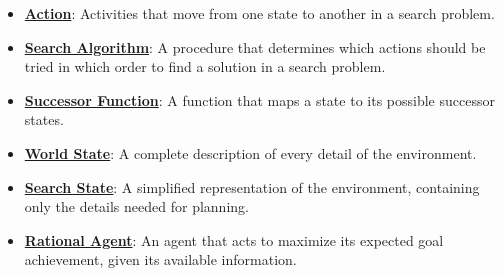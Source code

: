 \documentclass{article}%
\begin{document}
\begin{itemize}[leftmargin=*]
\item \href{https://purdue.brightspace.com/d2l/common/assets/pdfjs-d2l-dist/1.0.14-legacy/web/viewer.html?file=%2Fcontent%2Fenforced%2F1095467-wl.202510.CS.24300.001%2F14L1-DepthFS.pdf%3Fou%3D1095467&lang=en-us&container=d2l-fileviewer-rendered-pdf&fullscreen=d2l-fileviewer-rendered-pdf-dialog&height=667#page=14}{\textbf{Action}}: Activities that move from one state to another in a search problem.%
\item \href{https://purdue.brightspace.com/d2l/common/assets/pdfjs-d2l-dist/1.0.14-legacy/web/viewer.html?file=%2Fcontent%2Fenforced%2F1095467-wl.202510.CS.24300.001%2F14L1-DepthFS.pdf%3Fou%3D1095467&lang=en-us&container=d2l-fileviewer-rendered-pdf&fullscreen=d2l-fileviewer-rendered-pdf-dialog&height=667#page=14}{\textbf{Search Algorithm}}: A procedure that determines which actions should be tried in which order to find a solution in a search problem.%
\item \href{https://purdue.brightspace.com/d2l/common/assets/pdfjs-d2l-dist/1.0.14-legacy/web/viewer.html?file=%2Fcontent%2Fenforced%2F1095467-wl.202510.CS.24300.001%2F14L1-DepthFS.pdf%3Fou%3D1095467&lang=en-us&container=d2l-fileviewer-rendered-pdf&fullscreen=d2l-fileviewer-rendered-pdf-dialog&height=667#page=36}{\textbf{Successor Function}}: A function that maps a state to its possible successor states.%
\item \href{https://purdue.brightspace.com/d2l/common/assets/pdfjs-d2l-dist/1.0.14-legacy/web/viewer.html?file=%2Fcontent%2Fenforced%2F1095467-wl.202510.CS.24300.001%2F14L1-DepthFS.pdf%3Fou%3D1095467&lang=en-us&container=d2l-fileviewer-rendered-pdf&fullscreen=d2l-fileviewer-rendered-pdf-dialog&height=667#page=37}{\textbf{World State}}: A complete description of every detail of the environment.%
\item \href{https://purdue.brightspace.com/d2l/common/assets/pdfjs-d2l-dist/1.0.14-legacy/web/viewer.html?file=%2Fcontent%2Fenforced%2F1095467-wl.202510.CS.24300.001%2F14L1-DepthFS.pdf%3Fou%3D1095467&lang=en-us&container=d2l-fileviewer-rendered-pdf&fullscreen=d2l-fileviewer-rendered-pdf-dialog&height=667#page=37}{\textbf{Search State}}: A simplified representation of the environment, containing only the details needed for planning.%
\item \href{https://purdue.brightspace.com/d2l/common/assets/pdfjs-d2l-dist/1.0.14-legacy/web/viewer.html?file=%2Fcontent%2Fenforced%2F1095467-wl.202510.CS.24300.001%2F14L1-DepthFS.pdf%3Fou%3D1095467&lang=en-us&container=d2l-fileviewer-rendered-pdf&fullscreen=d2l-fileviewer-rendered-pdf-dialog&height=667#page=39}{\textbf{Rational Agent}}: An agent that acts to maximize its expected goal achievement, given its available information.%
\end{itemize}
\end{document}
